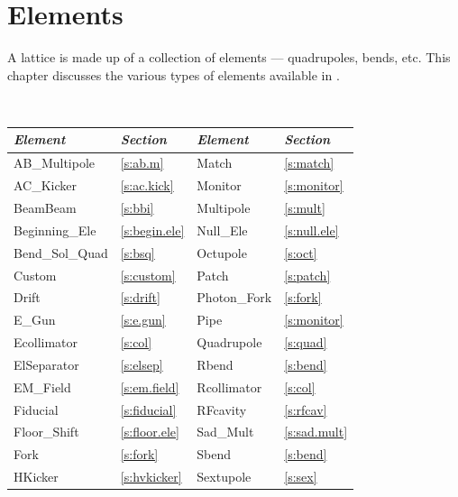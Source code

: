 \chapter{Elements}
\label{c:elements}

A lattice is made up of a collection of elements --- quadrupoles,
bends, etc. This chapter discusses the various types of elements
available in \bmad.

\begin{table}[htb]
\centering
{\tt
\begin{tabular}{llll} \toprule
  {\it Element}     & {\it Section}       & {\it Element}      & {\it Section}    \\ \midrule
  AB_Multipole      & \ref{s:ab.m}        &  Match             & \ref{s:match}    \\ 
  AC_Kicker         & \ref{s:ac.kick}     &  Monitor           & \ref{s:monitor}  \\
  BeamBeam          & \ref{s:bbi}         &  Multipole         & \ref{s:mult}     \\
  Beginning_Ele     & \ref{s:begin.ele}   &  Null_Ele          & \ref{s:null.ele} \\
  Bend_Sol_Quad     & \ref{s:bsq}         &  Octupole          & \ref{s:oct}      \\
  Custom            & \ref{s:custom}      &  Patch             & \ref{s:patch}    \\
  Drift             & \ref{s:drift}       &  Photon_Fork       & \ref{s:fork}     \\
  E_Gun             & \ref{s:e.gun}       &  Pipe              & \ref{s:monitor}  \\
  Ecollimator       & \ref{s:col}         &  Quadrupole        & \ref{s:quad}     \\
  ElSeparator       & \ref{s:elsep}       &  Rbend             & \ref{s:bend}     \\
  EM_Field          & \ref{s:em.field}    &  Rcollimator       & \ref{s:col}      \\
  Fiducial          & \ref{s:fiducial}    &  RFcavity          & \ref{s:rfcav}    \\
  Floor_Shift       & \ref{s:floor.ele}   &  Sad_Mult          & \ref{s:sad.mult} \\
  Fork              & \ref{s:fork}        &  Sbend             & \ref{s:bend}     \\
  HKicker           & \ref{s:hvkicker}    &  Sextupole         & \ref{s:sex}      \\

\end{tabular}}
\end{table}
